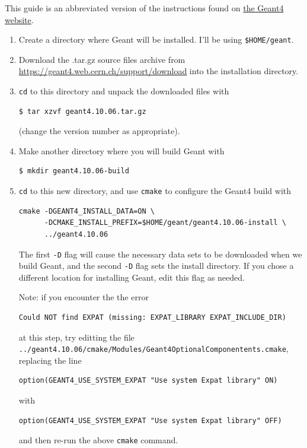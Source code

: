 \documentclass[12pt]{article}
\begin{document}
This guide is an abbreviated version of the instructions found on
\href{http://geant4-userdoc.web.cern.ch/geant4-userdoc/UsersGuides/InstallationGuide/html/}{the
Geant4 website}.
\begin{enumerate}
\item
Create a directory where Geant will be installed. I'll be using \texttt{\$HOME/geant}.

\item
Download the .tar.gz source files archive from \url{https://geant4.web.cern.ch/support/download}
into the installation directory.

\item
\texttt{cd} to this directory and unpack the downloaded files with
\begin{verbatim}
$ tar xzvf geant4.10.06.tar.gz
\end{verbatim}
(change the version number as appropriate).

\item
Make another directory where you will build Geant with
\begin{verbatim}
$ mkdir geant4.10.06-build
\end{verbatim}

\item
\texttt{cd} to this new directory, and use \texttt{cmake} to configure the Geant4 build with
\begin{verbatim}
cmake -DGEANT4_INSTALL_DATA=ON \
      -DCMAKE_INSTALL_PREFIX=$HOME/geant/geant4.10.06-install \
      ../geant4.10.06
\end{verbatim}
The first \texttt{-D} flag will cause the necessary data sets to be downloaded when we build Geant, and the second \texttt{-D} flag sets the install directory.
If you chose a different location for installing Geant, edit this flag as needed.

Note: if you encounter the the error
\begin{verbatim}
Could NOT find EXPAT (missing: EXPAT_LIBRARY EXPAT_INCLUDE_DIR)
\end{verbatim}
at this step, try editting the file \\
\texttt{../geant4.10.06/cmake/Modules/Geant4OptionalComponentents.cmake}, \\
replacing the line
\begin{verbatim}
option(GEANT4_USE_SYSTEM_EXPAT "Use system Expat library" ON)
\end{verbatim}
with
\begin{verbatim}
option(GEANT4_USE_SYSTEM_EXPAT "Use system Expat library" OFF)
\end{verbatim}
and then re-run the above \texttt{cmake} command.


\end{enumerate}
\end{document}
